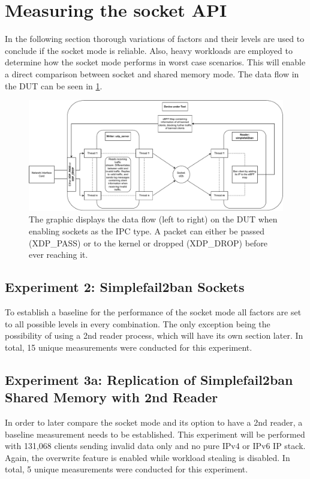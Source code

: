 \section{Measuring the socket API}
In the following section thorough variations of factors and their levels are used to conclude if the socket mode is reliable.
Also, heavy workloads are employed to determine how the socket mode performs in worst case scenarios.
This will enable a direct comparison between socket and shared memory mode.
The data flow in the DUT can be seen in \ref{fig:socket:measurement}.

\begin{figure}[h!]
    \centerline{\includegraphics[width=1.2\textwidth]{images/MeasurementArchitecture.pdf}}
    \caption[DUT during socket measurements]{
        The graphic displays the data flow (left to right) on the DUT when enabling sockets as the IPC type.
        A packet can either be passed (XDP\_PASS) or to the kernel or dropped (XDP\_DROP) before ever reaching it.}
	\label{fig:socket:measurement}
\end{figure}


\subsection{Experiment 2: Simplefail2ban Sockets}
To establish a baseline for the performance of the socket mode all factors are set to all possible levels in every combination.
The only exception being the possibility of using a 2nd reader process, which will have its own section later.
In total, 15 unique measurements were conducted for this experiment.

\subsection{Experiment 3a: Replication of Simplefail2ban Shared Memory with 2nd Reader}
In order to later compare the socket mode and its option to have a 2nd reader, a baseline measurement needs to be established.
This experiment will be performed with 131,068 clients sending invalid data only and no pure IPv4 or IPv6 IP stack.
Again, the overwrite feature is enabled while workload stealing is disabled.
In total, 5 unique measurements were conducted for this experiment.

